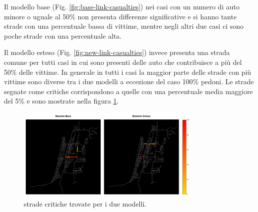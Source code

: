 Il modello base (Fig. \ref{fig:base-link-casualties}) nei casi con un numero di auto minore o uguale al 50\%
non presenta differenze significative e si hanno tante strade con una percentuale bassa di vittime, 
mentre negli altri due casi ci sono poche strade con una percentuale alta.

Il modello esteso (Fig. \ref{fig:new-link-casualties}) invece presenta una strada comune per tutti casi 
in cui sono presenti delle auto che contribuisce a più del 50\% delle vittime.
%
In generale in tutti i casi la maggior parte delle strade con più vittime sono diverse tra i due modelli a eccezione del caso 
100\% pedoni.
%
Le strade segnate come critiche corrispondono a quelle con una percentuale media maggiore del 5\% e sono mostrate nella figura \ref{fig:analisi-comparison-critical-links2}.

\begin{figure}[ht]
    \centering
    \includegraphics[width=0.8\textwidth]{images/analisi/casualties-map.png}
    \caption{strade critiche trovate per i due modelli.}
    \label{fig:analisi-comparison-critical-links2}
\end{figure}

\newpage


